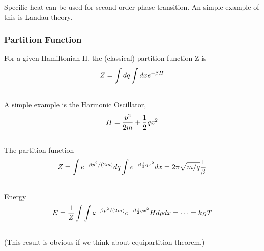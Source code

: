 \documentclass[letterpaper,10pt,english]{sphinxmanual}
\begin{document}
Specific heat can be used for second order phase transition. An simple example of this is Landau theory.


\subsubsection{Partition Function}
\label{equilibrium/week2:partition-function}
For a given Hamiltonian H, the (classical) partition function Z is
\begin{gather}
\begin{split}Z = \int d q \int d x e^{-\beta H}\end{split}\notag\\\begin{split}\end{split}\notag
\end{gather}
A simple example is the Harmonic Oscillator,
\begin{gather}
\begin{split}H = \frac{p^2}{2m} + \frac{1}{2} q x^2\end{split}\notag\\\begin{split}\end{split}\notag
\end{gather}
The partition function
\begin{gather}
\begin{split}Z = \int e^{-\beta p^2/(2m)} d q \int  e^{-\beta \frac{1}{2} q x^2 } d x  = 2\pi \sqrt{m/q} \frac{1}{\beta}\end{split}\notag\\\begin{split}\end{split}\notag
\end{gather}
Energy
\begin{gather}
\begin{split}E = \frac{1}{Z} \int \int e^{-\beta p^2/(2m)}   e^{-\beta \frac{1}{2} q x^2 }  H d p d x  = \cdots = k_B T\end{split}\notag\\\begin{split}\end{split}\notag
\end{gather}
(This result is obvious if we think about equipartition theorem.)
\end{document}
